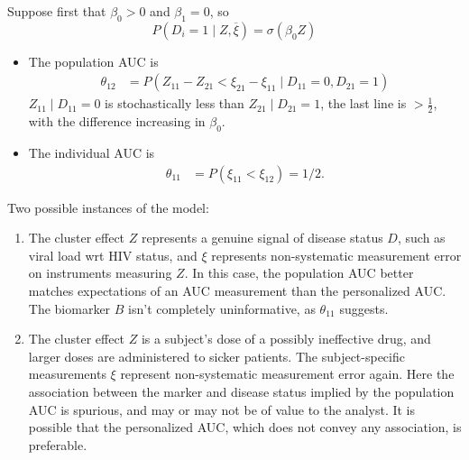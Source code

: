 \documentclass{beamer}
\DeclareMathOperator{\E}{E}
\renewcommand{\P}{P}
\newcommand{\cind}{\perp \!\!\! \perp}
\newcommand{\aucindiv}{\theta_{11}}%
\newcommand{\aucpop}{\theta_{12}}%
\begin{document}
\begin{frame}
  Suppose first that $\beta_0>0$ and $\beta_1=0$, so $$\P(D_i=1\mid  Z,\overline \xi)=\sigma(\beta_0 Z)$$
  \begin{itemize}
  \item The population AUC is
\begin{align}
  \aucpop %
	&=\P(Z_{11}-Z_{21} < \xi_{21}-\xi_{11}\mid D_{11}=0, D_{21}=1)
\end{align}
 $Z_{11}\mid D_{11}=0$ is stochastically less than $Z_{21}\mid D_{21}=1$,%
 the last line is $>\frac12$, with the difference increasing in $\beta_0$.

\item The individual AUC is
\begin{align}
  \aucindiv %
  &=\P(\xi_{11}<\xi_{12})=1/2.
\end{align}
\end{itemize}
\end{frame}
\begin{frame}
  Two possible instances of the model:
  \begin{enumerate}%
  \item The cluster effect $Z$ represents a genuine signal of disease
    status $D$, such as viral load wrt HIV status, and $\xi$ represents
    non-systematic measurement error on instruments measuring $Z$. In this
    case, the population AUC better matches expectations of an AUC
    measurement than the personalized AUC. The biomarker $B$ isn't
    completely uninformative, as $\aucindiv$ suggests.
  \item \label{item:example:threshold model:spurious} The cluster effect $Z$ is a subject's dose of a possibly ineffective drug,
    and larger doses are administered to sicker patients. The subject-specific
    measurements $\xi$ represent non-systematic measurement error
    again. Here the association between the marker and disease status
    implied by the population AUC is spurious, and may or may not be of
    value to the analyst. It is possible that the personalized AUC, which
    does not convey any association, is preferable.
  \end{enumerate}
\end{frame}
\end{document}

